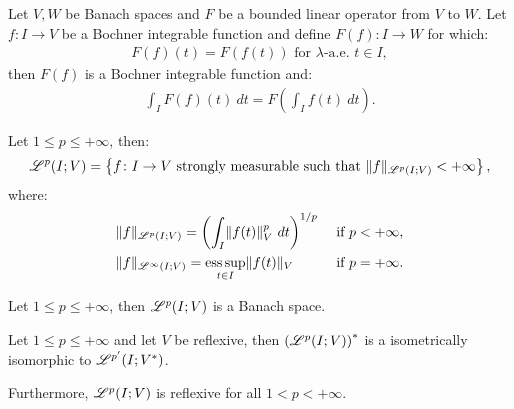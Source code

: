 \begin{corollary}
    Let $V, W$ be Banach spaces and $F$ be a bounded linear operator from $V$ to $W$. Let $f\colon I \rightarrow V$ be a Bochner integrable function and define $F(f) \colon I \rightarrow W$ for which:
    \begin{gather}
        F(f)(t) = F(f(t)) \text{ for } \lambda \text{-a.e. } t \in I,
    \end{gather}
    then $F(f)$ is a Bochner integrable function and:
    \begin{gather}
        \int_I F(f)(t) ~ dt = F\left( \int_I f(t) ~ dt \right).
    \end{gather}
\end{corollary}

\begin{definition}[$\Lp{p}(I; V)$]
    Let $1 \leq p \leq +\infty$, then:
    \begin{gather}
        \mathscr{L}^{p}(I; V) = \left\{ f \colon I \rightarrow V \text{ strongly measurable such that } \lVert f \rVert_{\mathscr{L}^{p}(I; V)} < +\infty \right\},
    \end{gather}
    where:
    \begin{align}
        & \lVert f \rVert_{\mathscr{L}^{p}(I; V)} = \left( \int_I \lVert f(t) \rVert_V^p ~ dt \right)^{1/p} & \text{ if } p < +\infty, \\
        & \lVert f \rVert_{\mathscr{L}^{\infty}(I; V)} = \operatorname*{ess\,sup}_{t \in I} \lVert f(t) \rVert_V & \text{ if } p = +\infty.
    \end{align}
\end{definition}

\begin{theorem}
    Let $1 \leq p \leq +\infty$, then $\Lp{p}(I; V)$ is a Banach space.
\end{theorem}

\begin{theorem}
    Let $1 \leq p \leq +\infty$ and let $V$ be reflexive, then $\left( \mathscr{L}^{p}(I; V) \right)^{*}$ is a isometrically isomorphic to $\mathscr{L}^{p^{\prime}}(I; V^{*})$.

    Furthermore, $\Lp{p}(I; V)$ is reflexive for all $1 < p < +\infty$.
\end{theorem}